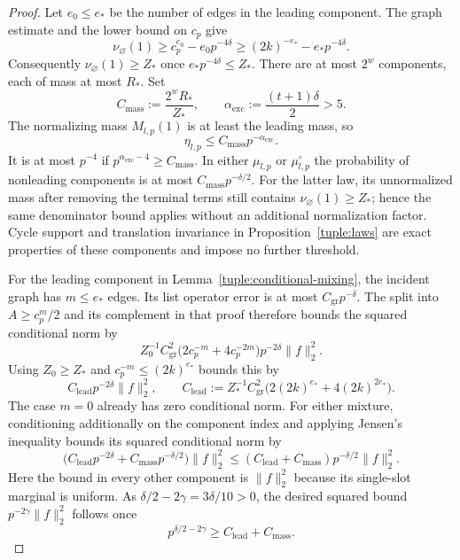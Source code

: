 \begin{proof}
Let $e_0\le e_*$ be the number of edges in the leading component.
The graph estimate and the lower bound on $c_p$ give
\[
 \nu_{\varnothing}(1)
 \ge c_p^{e_0}-e_0p^{-4\delta}
 \ge (2k)^{-e_*}-e_*p^{-4\delta}.
\]
Consequently $\nu_{\varnothing}(1)\ge Z_*$ once
$e_*p^{-4\delta}\le Z_*$.  There are at most $2^w$ components, each of
mass at most $R_*$.  Set
\[
 C_{\mathrm{mass}}:=\frac{2^wR_*}{Z_*},\qquad
 \alpha_{\mathrm{exc}}:=\frac{(t+1)\delta}{2}>5.
\]
The normalizing mass $M_{l,p}(1)$ is at least the leading mass, so
\[
 \eta_{l,p}\le C_{\mathrm{mass}}p^{-\alpha_{\mathrm{exc}}}.
\]
It is at most $p^{-4}$ if
$p^{\alpha_{\mathrm{exc}}-4}\ge C_{\mathrm{mass}}$.  In either
$\mu_{l,p}$ or $\mu_{l,p}^{\circ}$ the probability of nonleading
components is at most $C_{\mathrm{mass}}p^{-\delta/2}$.  For the latter
law, its unnormalized mass after removing the terminal terms still
contains $\nu_{\varnothing}(1)\ge Z_*$; hence the same denominator
bound applies without an additional normalization factor.  Cycle support
and translation invariance in Proposition~\ref{tuple:laws} are exact
properties of these components and impose no further threshold.

For the leading component in Lemma~\ref{tuple:conditional-mixing}, the
incident graph has $m\le e_*$ edges.  Its list operator error is at most
$C_{\mathrm{gr}}p^{-\delta}$.  The split into $A\ge c_p^m/2$ and its
complement in that proof therefore bounds the squared conditional norm by
\[
 Z_0^{-1}C_{\mathrm{gr}}^2
 \bigl(2c_p^{-m}+4c_p^{-2m}\bigr)p^{-2\delta}\|f\|_2^2.
\]
Using $Z_0\ge Z_*$ and $c_p^{-m}\le(2k)^{e_*}$ bounds this by
\[
 C_{\mathrm{lead}}p^{-2\delta}\|f\|_2^2,
 \qquad
 C_{\mathrm{lead}}:=Z_*^{-1}C_{\mathrm{gr}}^2
 \bigl(2(2k)^{e_*}+4(2k)^{2e_*}\bigr).
\]
The case $m=0$ already has zero conditional norm.  For either mixture,
conditioning additionally on the component index and applying Jensen's
inequality bounds its squared conditional norm by
\[
 \bigl(C_{\mathrm{lead}}p^{-2\delta}
       +C_{\mathrm{mass}}p^{-\delta/2}\bigr)\|f\|_2^2
 \le (C_{\mathrm{lead}}+C_{\mathrm{mass}})
       p^{-\delta/2}\|f\|_2^2.
\]
Here the bound in every other component is $\|f\|_2^2$ because its
single-slot marginal is uniform.  As
$\delta/2-2\gamma=3\delta/10>0$, the desired squared bound
$p^{-2\gamma}\|f\|_2^2$ follows once
\[
 p^{\delta/2-2\gamma}\ge C_{\mathrm{lead}}+C_{\mathrm{mass}}.
\]


\end{proof}
